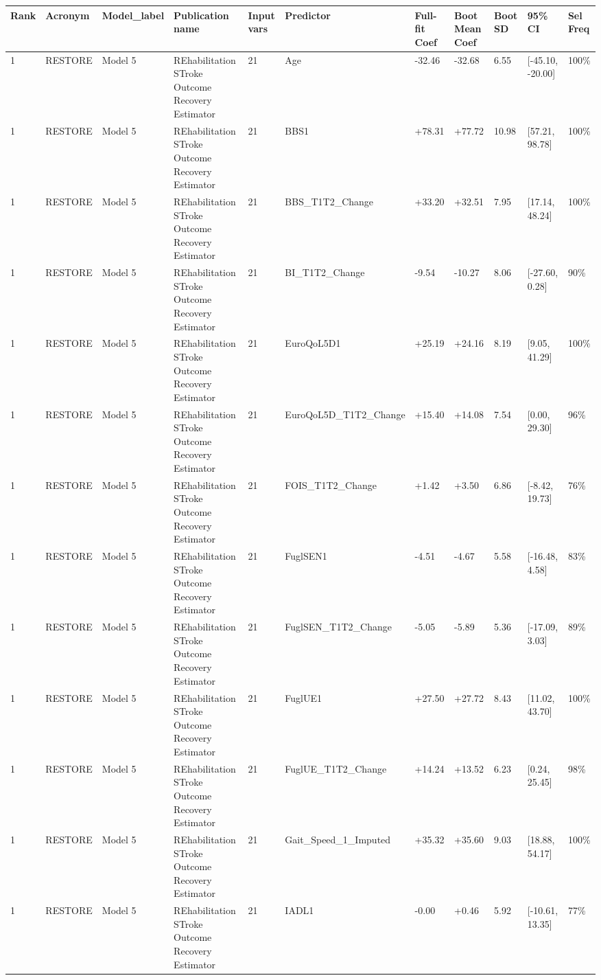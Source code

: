 \begin{tabular}{lllllllllll}
\hline
Rank & Acronym & Model\_label & Publication name & Input vars & Predictor & Full-fit Coef & Boot Mean Coef & Boot SD & 95\% CI & Sel Freq \\
\hline
1 & RESTORE & Model 5 & REhabilitation STroke Outcome Recovery Estimator & 21 & Age & -32.46 & -32.68 & 6.55 & [-45.10, -20.00] & 100\% \\
1 & RESTORE & Model 5 & REhabilitation STroke Outcome Recovery Estimator & 21 & BBS1 & +78.31 & +77.72 & 10.98 & [57.21, 98.78] & 100\% \\
1 & RESTORE & Model 5 & REhabilitation STroke Outcome Recovery Estimator & 21 & BBS\_T1T2\_Change & +33.20 & +32.51 & 7.95 & [17.14, 48.24] & 100\% \\
1 & RESTORE & Model 5 & REhabilitation STroke Outcome Recovery Estimator & 21 & BI\_T1T2\_Change & -9.54 & -10.27 & 8.06 & [-27.60, 0.28] & 90\% \\
1 & RESTORE & Model 5 & REhabilitation STroke Outcome Recovery Estimator & 21 & EuroQoL5D1 & +25.19 & +24.16 & 8.19 & [9.05, 41.29] & 100\% \\
1 & RESTORE & Model 5 & REhabilitation STroke Outcome Recovery Estimator & 21 & EuroQoL5D\_T1T2\_Change & +15.40 & +14.08 & 7.54 & [0.00, 29.30] & 96\% \\
1 & RESTORE & Model 5 & REhabilitation STroke Outcome Recovery Estimator & 21 & FOIS\_T1T2\_Change & +1.42 & +3.50 & 6.86 & [-8.42, 19.73] & 76\% \\
1 & RESTORE & Model 5 & REhabilitation STroke Outcome Recovery Estimator & 21 & FuglSEN1 & -4.51 & -4.67 & 5.58 & [-16.48, 4.58] & 83\% \\
1 & RESTORE & Model 5 & REhabilitation STroke Outcome Recovery Estimator & 21 & FuglSEN\_T1T2\_Change & -5.05 & -5.89 & 5.36 & [-17.09, 3.03] & 89\% \\
1 & RESTORE & Model 5 & REhabilitation STroke Outcome Recovery Estimator & 21 & FuglUE1 & +27.50 & +27.72 & 8.43 & [11.02, 43.70] & 100\% \\
1 & RESTORE & Model 5 & REhabilitation STroke Outcome Recovery Estimator & 21 & FuglUE\_T1T2\_Change & +14.24 & +13.52 & 6.23 & [0.24, 25.45] & 98\% \\
1 & RESTORE & Model 5 & REhabilitation STroke Outcome Recovery Estimator & 21 & Gait\_Speed\_1\_Imputed & +35.32 & +35.60 & 9.03 & [18.88, 54.17] & 100\% \\
1 & RESTORE & Model 5 & REhabilitation STroke Outcome Recovery Estimator & 21 & IADL1 & -0.00 & +0.46 & 5.92 & [-10.61, 13.35] & 77\% \\

\end{tabular}

